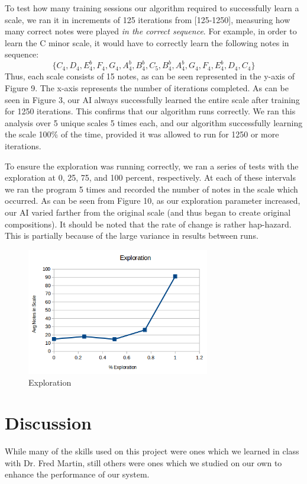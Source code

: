 \documentclass{chi2009}
\begin{document}
To test how many training sessions our algorithm required to successfully learn a scale, we ran it in increments of 125 iterations from [125-1250], measuring how many correct notes were played \textit{in the correct sequence}.  For example, in order to learn the C minor scale, it would have to correctly learn the following notes in sequence:
$$\{C_4, D_4, E^b_4, F_4, G_4, A^b_4, B^b_4, C_5, B^b_4, A^b_4, G_4, F_4, E^b_4, D_4, C_4\}$$
Thus, each scale consists of 15 notes, as can be seen represented in the y-axis of Figure 9.  The x-axis represents the number of iterations completed.  As can be seen in Figure 3, our AI always successfully learned the entire scale after training for 1250 iterations.  This confirms that our algorithm runs correctly.  We ran this analysis over 5 unique scales 5 times each, and our algorithm successfully learning the scale 100\% of the time, provided it was allowed to run for 1250 or more iterations.


To ensure the exploration was running correctly, we ran a series of tests with the exploration at 0, 25, 75, and 100 percent, respectively.  At each of these intervals we ran the program 5 times and recorded the number of notes in the scale which occurred.  As can be seen from Figure 10, as our exploration parameter increased, our AI varied farther from the original scale (and thus began to create original compositions).  It should be noted that the rate of change is rather hap-hazard.  This is partially because of the large variance in results between runs.

\begin{figure}[htp]
\centering
\includegraphics[width=8cm]{graph2}
\caption{Exploration}
\label{fig:exploration}
\end{figure}
\section{Discussion}

While many of the skills used on this project were ones which we learned in class with Dr. Fred Martin, still others were ones which we studied on our own to enhance the performance of our system.
\end{document}
